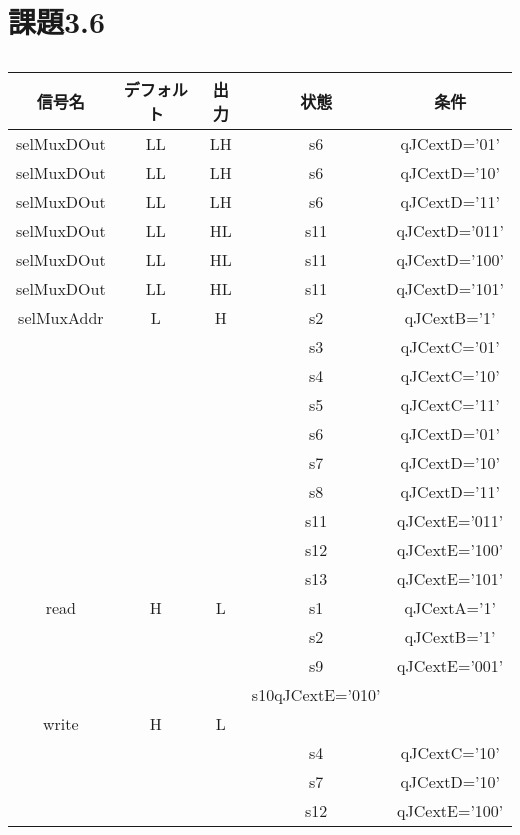 \documentclass[dvipdfmx]{jarticle}
\begin{document}
\section{課題3.6}
\begin{table}[h]
    \centering
    \begin{tabular}{|c|c|c|c|c|}
    \hline
    信号名&デフォルト&出力&状態&条件\\\hline
    selMuxDOut&LL&LH&s6&qJCextD='01'\\
    selMuxDOut&LL&LH&s6&qJCextD='10'\\
    selMuxDOut&LL&LH&s6&qJCextD='11'\\
    selMuxDOut&LL&HL&s11&qJCextD='011'\\
    selMuxDOut&LL&HL&s11&qJCextD='100'\\
    selMuxDOut&LL&HL&s11&qJCextD='101'\\
    \hline
    selMuxAddr&L&H&s2&qJCextB='1'\\
    &&&s3&qJCextC='01'\\
    &&&s4&qJCextC='10'\\
    &&&s5&qJCextC='11'\\
    &&&s6&qJCextD='01'\\
    &&&s7&qJCextD='10'\\
    &&&s8&qJCextD='11'\\
    &&&s11&qJCextE='011'\\
    &&&s12&qJCextE='100'\\
    &&&s13&qJCextE='101'\\\hline
    read&H&L&s1&qJCextA='1'\\
    &&&s2&qJCextB='1'\\
    &&&s9&qJCextE='001'\\
    &&&s10qJCextE='010'\\
    \hline
    write&H&L&&\\
    &&&s4&qJCextC='10'\\
    &&&s7&qJCextD='10'\\
    &&&s12&qJCextE='100'\\
    \hline
    \end{tabular}
    \caption{}
\end{table}
\end{document}
